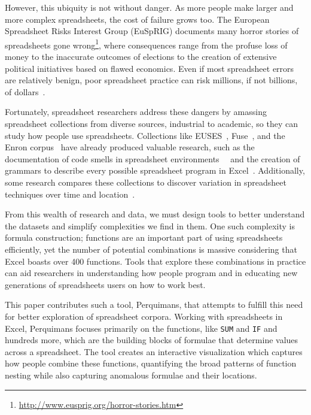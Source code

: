 \documentclass[conference]{IEEEtran}
\newcommand{\toolname}{Perquimans\xspace} \newcommand{\toolnameend}{Perquimans}
\begin{document}
	However, this ubiquity is not without danger. As more people make larger and
	more complex spreadsheets, the cost of failure grows too. The European
	Spreadsheet Risks Interest Group (EuSpRIG) documents many horror stories of
	spreadsheets gone
	wrong\footnote{\href{http://www.eusprig.org/horror-stories.htm}{http://www.eusprig.org/horror-stories.htm}}, where consequences range from the profuse loss of money to the inaccurate outcomes of elections to the creation of extensive political initiatives based on flawed economics. Even if most spreadsheet errors are relatively benign, poor spreadsheet practice can risk millions, if not billions, of dollars~\cite{powell2009impact}.
	
	Fortunately, spreadsheet researchers address these dangers by amassing
	spreadsheet collections from diverse sources, industrial to academic, so
	they can study how people use spreadsheets. Collections like
	EUSES~\cite{fisher2005euses}, Fuse~\cite{barik2015fuse}, and the Enron
	corpus~\cite{hermans2015enron} have already produced valuable research, such
	as the documentation of code smells in spreadsheet
	environments~\cite{hermans2012detecting}~\cite{jansen2015code} and the creation
	of grammars to describe every possible spreadsheet program in
	Excel~\cite{aivaloglou2015grammar}. Additionally, some research compares these
	collections to discover variation in spreadsheet techniques over time and
	location~\cite{jansen2015enron}.
	
	From this wealth of research and data, we must design tools to better understand
	the datasets and simplify complexities we find in them. One such complexity
	is formula construction; functions are an important part of using spreadsheets
	efficiently, yet the number of potential combinations is massive considering
	that Excel boasts over 400 functions. Tools that explore these combinations in
	practice can aid researchers in understanding how people program and in
	educating new generations of spreadsheets users on how to work best.
	
	This paper contributes such a tool, \toolnameend, that attempts to fulfill this
	need for better exploration of spreadsheet corpora. Working with spreadsheets
	in Excel, \toolname focuses primarily on the functions, like \texttt{SUM} and \texttt{IF} and
	hundreds more, which are the building blocks of formulae that determine values
	across a spreadsheet. The tool creates an interactive visualization which
	captures how people combine these functions, quantifying the broad patterns of
	function nesting while also capturing anomalous formulae and their locations.
	
\end{document}
